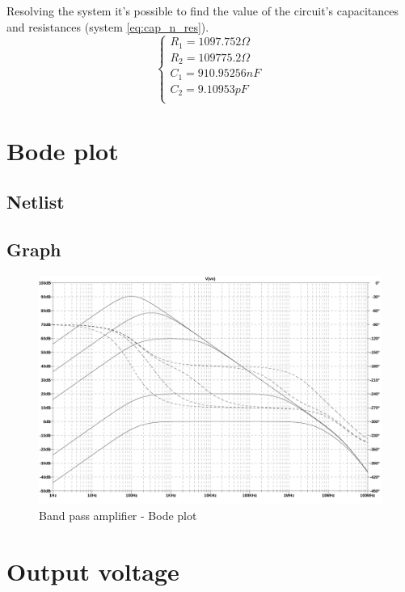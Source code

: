 \documentclass[10pt,a4paper]{book}
\begin{document}
Resolving the system it's possible to find the value of the circuit's capacitances and resistances (system \ref{eq:cap_n_res}).
\begin{equation}
  \left\{
  \begin{array}{l}
    R_1 = 1097.752\Omega\\
    R_2 = 109775.2\Omega\\
    C_1 = 910.95256nF\\
    C_2 = 9.10953pF\\
  \end{array}
  \right. \label{eq:cap_n_res}
\end{equation}

\section{Bode plot}
\subsection{Netlist}


\subsection{Graph}
\begin{figure}[H]
  \centering
  \includegraphics[width=14cm]{graph/2d3.jpg}
  \caption{Band pass amplifier - Bode plot}
  \label{2d3graph}
\end{figure}

\section{Output voltage}
\end{document}
